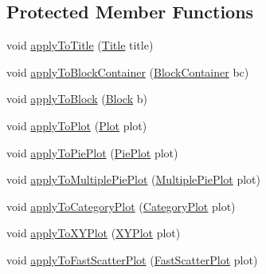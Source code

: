 \subsection*{Protected Member Functions}
\begin{DoxyCompactItemize}
\item 
void \mbox{\hyperlink{classorg_1_1jfree_1_1chart_1_1_standard_chart_theme_a8f70e3a4168f072d89828e305e613334}{apply\+To\+Title}} (\mbox{\hyperlink{classorg_1_1jfree_1_1chart_1_1title_1_1_title}{Title}} title)
\item 
void \mbox{\hyperlink{classorg_1_1jfree_1_1chart_1_1_standard_chart_theme_a8f798140e6097853ea83b39e4b4309ae}{apply\+To\+Block\+Container}} (\mbox{\hyperlink{classorg_1_1jfree_1_1chart_1_1block_1_1_block_container}{Block\+Container}} bc)
\item 
void \mbox{\hyperlink{classorg_1_1jfree_1_1chart_1_1_standard_chart_theme_aff9fc6c6abedb681e6dfd224b2cb7a66}{apply\+To\+Block}} (\mbox{\hyperlink{interfaceorg_1_1jfree_1_1chart_1_1block_1_1_block}{Block}} b)
\item 
void \mbox{\hyperlink{classorg_1_1jfree_1_1chart_1_1_standard_chart_theme_ad80532276c7939f2edd60c1c54447d49}{apply\+To\+Plot}} (\mbox{\hyperlink{classorg_1_1jfree_1_1chart_1_1plot_1_1_plot}{Plot}} plot)
\item 
void \mbox{\hyperlink{classorg_1_1jfree_1_1chart_1_1_standard_chart_theme_adeb3bc92afb95352251c1af7cedccaa6}{apply\+To\+Pie\+Plot}} (\mbox{\hyperlink{classorg_1_1jfree_1_1chart_1_1plot_1_1_pie_plot}{Pie\+Plot}} plot)
\item 
void \mbox{\hyperlink{classorg_1_1jfree_1_1chart_1_1_standard_chart_theme_abf8893c8269cd2f2c6ce15b506b45e24}{apply\+To\+Multiple\+Pie\+Plot}} (\mbox{\hyperlink{classorg_1_1jfree_1_1chart_1_1plot_1_1_multiple_pie_plot}{Multiple\+Pie\+Plot}} plot)
\item 
void \mbox{\hyperlink{classorg_1_1jfree_1_1chart_1_1_standard_chart_theme_a2d154e98884ec2a197ad15deb73e0a44}{apply\+To\+Category\+Plot}} (\mbox{\hyperlink{classorg_1_1jfree_1_1chart_1_1plot_1_1_category_plot}{Category\+Plot}} plot)
\item 
void \mbox{\hyperlink{classorg_1_1jfree_1_1chart_1_1_standard_chart_theme_a003c5f22c4ae3f1a4bf8196acdf4cb1b}{apply\+To\+X\+Y\+Plot}} (\mbox{\hyperlink{classorg_1_1jfree_1_1chart_1_1plot_1_1_x_y_plot}{X\+Y\+Plot}} plot)
\item 
void \mbox{\hyperlink{classorg_1_1jfree_1_1chart_1_1_standard_chart_theme_ad1c3878856b80553d73a75689d7f3bc2}{apply\+To\+Fast\+Scatter\+Plot}} (\mbox{\hyperlink{classorg_1_1jfree_1_1chart_1_1plot_1_1_fast_scatter_plot}{Fast\+Scatter\+Plot}} plot)

\end{DoxyCompactItemize}
